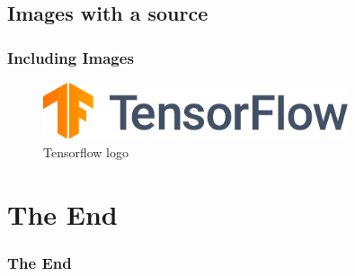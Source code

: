 \documentclass[lualatex]{beamer}
\begin{document}
\subsection{Images with a source}
\begin{frame}
	\frametitle{Including Images}
	\begin{figure}
		\centering
		\includegraphics[width=0.8\textwidth]{images/tensorflow.pdf}
		\caption{Tensorflow logo}
	\end{figure}
\end{frame}


\section{The End}
\begin{frame}
	\frametitle{The End}
\end{frame}
\end{document}

